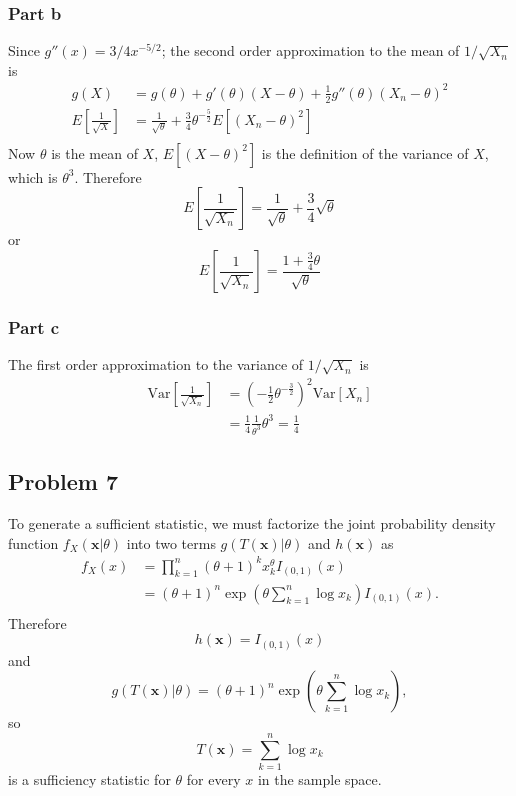 \documentclass{article}
\begin{document}
\subsubsection*{Part b}
Since $g''(x) = 3/4x^{-5/2}$; the second order approximation to the mean of $1/\sqrt{X_n}$ is 
\[\begin{aligned}
g(X) &= g(\theta)+g'(\theta)(X-\theta)+\frac{1}{2}g''(\theta)(X_n-\theta)^2 \\
E\left[\frac{1}{\sqrt{X}}\right] &= \frac{1}{\sqrt{\theta}} + \frac{3}{4}\theta^{-\frac{5}{2}}E\left[(X_n - \theta)^2\right] \\
\end{aligned}\]
Now $\theta$ is the mean of $X$, $E\left[(X - \theta)^2\right]$ is the definition of the variance of $X$, which is $\theta^3$. Therefore
\[E\left[\frac{1}{\sqrt{X_n}}\right] = \frac{1}{\sqrt{\theta}} + \frac{3}{4}\sqrt{\theta}\] or 
\[E\left[\frac{1}{\sqrt{X_n}}\right] = \frac{1+\frac{3}{4}\theta}{\sqrt{\theta}}\]
\subsubsection*{Part c}
The first order approximation to the variance of $1/\sqrt{X_n}$ is 
\[\begin{aligned}
\text{Var}\left[\frac{1}{\sqrt{X_n}}\right] &= \left(-\frac{1}{2}\theta^{-\frac{3}{2}}\right)^2\text{Var}\left[X_n\right] \\
&= \frac{1}{4}\frac{1}{\theta^3}\theta^3 = \frac{1}{4}
\end{aligned}\]
\subsection*{Problem 7}
To generate a sufficient statistic, we must factorize the joint probability density function
$f_X(\mathbf{x}|\theta)$ into two terms $g(T(\mathbf{x})|\theta)$ and $h(\mathbf{x})$ as 
\[\begin{aligned}
f_X(x) &= \prod_{k=1}^n(\theta+1)^kx_k^\theta I_{(0,1)}(x) \\
&= (\theta+1)^n \exp\left(\theta\sum_{k=1}^n \log{x_k}\right) I_{(0,1)}(x).\\
\end{aligned}\]
Therefore 
\[h(\mathbf{x}) = I_{(0,1)}(x)\]
and 
\[g(T(\mathbf{x})|\theta) = (\theta+1)^n \exp\left(\theta\sum_{k=1}^n \log{x_k}\right),\]
so 
\[T(\mathbf{x}) = \sum_{k=1}^n \log{x_k}\]
is a sufficiency statistic for $\theta$ for every $x$ in the sample space. 

 
\end{document}
